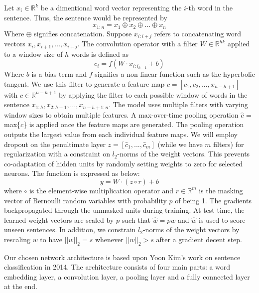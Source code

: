 \documentclass[conference]{IEEEtran}
\begin{document}
 Let $x_{i} \in \mathbb{R}^k$ be a dimentional word vector representing the $i$-th word in the 
 sentence. Thus, the sentence would be represented by 
 \begin{equation}
 x_{1:n} = x_1 \oplus x_2 \oplus ... \oplus x_n
 \end{equation}
 Where $\oplus$ signifies concatenation. Suppose $x_{i:i+j}$ refers to concatenating 
 word vectors $x_i, x_{i+1}, ... , x_{i+j}$. The convolution operator with a filter $W \in \mathbb{R}^{hk}$ applied to a window size of $h$ 
 words is defined as 
 \begin{equation}
 c_i = f(W \cdot x_{i:i_{h-1}} + b)
 \end{equation}
 Where $b$ is a bias term and $f$ signifies a non linear function such as the hyperbolic tangent. We use this
 filter to generate a feature map $c = [c_1, c_2, ... ,x_{n-h+1}]$ with $c \in \mathbb{R}^{n-h+1}$ by applying the filter to each possible window of words in the sentence $x_{1:h}, x_{2:h+1}, ... ,x_{n-h+1:n}$. 
 The model uses multiple filters with varying window sizes to obtain multiple features. 
 A max-over-time pooling operation $\hat{c}$ = max\{$c$\} is applied once the feature maps are generated. 
 The pooling operation outputs the largest value from each individual feature maps. 
 We will employ dropout on the penultimate layer $z = [\hat{c}_1,...,\hat{c}_m]$ (while we have $m$ filters) for regularization with a constraint on $l_2$-norms of the weight vectors. This prevents co-adaptation of hidden units by randomly setting weights to zero for selected neurons.  The function is expressed as below: 
 \begin{equation}
 y = W \cdot (z \circ r) + b
 \end{equation}
where $\circ$ is the element-wise multiplication operator and $r \in \mathbb{R}^m$ is the masking vector of Bernoulli random variables 
with probability $p$ of being 1. The gradients backpropagated through the unmasked units during training. At test time, the learned weight vectors are scaled by $p$ such that $\hat{w} = pw$ and $\hat{w}$ is used to score unseen sentences. 
In addition, we constrain $l_2$-norms of the weight vectors by rescaling $w$ to have $||w||_2 = s$ whenever $||w||_2 > s$ after a gradient decent step. 

     Our chosen network architecture is based upon Yoon Kim's work on sentence
     classification in 2014. The architecture consists of four main parts: a word
     embedding layer, a convolution layer, a pooling layer and a fully connected layer
     at the end.
     
\end{document}
